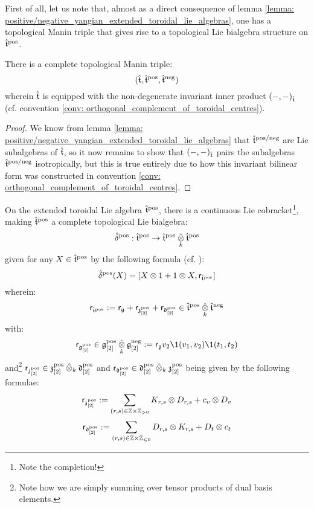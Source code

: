         First of all, let us note that, almost as a direct consequence of lemma \ref{lemma: positive/negative_yangian_extended_toroidal_lie_algebras}, one has a topological Manin triple that gives rise to a topological Lie bialgebra structure on $\hat{\mathfrak{t}}^{\mathrm{pos}}$.
        \begin{theorem} \label{theorem: extended_toroidal_manin_triples}
            There is a complete topological Manin triple:
                $$(\hat{\mathfrak{t}}, \hat{\mathfrak{t}}^{\mathrm{pos}}, \hat{\mathfrak{t}}^{\mathrm{neg}})$$
            wherein $\hat{\mathfrak{t}}$ is equipped with the non-degenerate invariant inner product $(-, -)_{\hat{\mathfrak{t}}}$ (cf. convention \ref{conv: orthogonal_complement_of_toroidal_centres}).
        \end{theorem}
            \begin{proof}
                We know from lemma \ref{lemma: positive/negative_yangian_extended_toroidal_lie_algebras} that $\hat{\mathfrak{t}}^{\mathrm{pos}/\mathrm{neg}}$ are Lie subalgebras of $\hat{\mathfrak{t}}$, so it now remains to show that $(-, -)_{\hat{\mathfrak{t}}}$ pairs the subalgebras $\hat{\mathfrak{t}}^{\mathrm{pos}/\mathrm{neg}}$ isotropically, but this is true entirely due to how this invariant bilinear form was constructed in convention \ref{conv: orthogonal_complement_of_toroidal_centres}.
            \end{proof}
        \begin{corollary} \label{coro: extended_toroidal_lie_bialgebras}
            On the extended toroidal Lie algebra $\hat{\mathfrak{t}}^{\mathrm{pos}}$, there is a continuous Lie cobracket\footnote{Note the completion!}, making $\hat{\mathfrak{t}}^{\mathrm{pos}}$ a complete topological Lie bialgebra:
                $$\hat{\delta}^{\positive}: \extendedtoroidal^{\positive} \to \extendedtoroidal^{\positive} \hattensor_k \extendedtoroidal^{\positive}$$
            given for any $X \in \hat{\mathfrak{t}}^{\mathrm{pos}}$ by the following formula (cf. \cite{etingof_kazhdan_quantisation_1}):
                $$\hat{\delta}^{\positive}(X) = [ X \tensor 1 + 1 \tensor X, \sfr_{\extendedtoroidal^{\positive}} ]$$
            wherein:
                $$\sfr_{\extendedtoroidal^{\positive}} := \sfr_{\g} + \sfr_{\z_{[2]}^{\positive}} + \sfr_{\d_{[2]}^{\positive}} \in \extendedtoroidal^{\positive} \hattensor_k \extendedtoroidal^{\negative}$$
            with:
                $$\sfr_{\g_{[2]}^{\positive}} \in \g_{[2]}^{\positive} \hattensor_k \g_{[2]}^{\negative} := \sfr_{\g} v_2 \1(v_1, v_2) \1(t_1, t_2)$$
            and\footnote{Note how we are simply summing over tensor products of dual basis elements.} $\sfr_{\z_{[2]}^{\positive}} \in \z_{[2]}^{\positive} \hattensor_k \d_{[2]}^{\positive}$ and $\sfr_{\d_{[2]}^{\positive}} \in \d_{[2]}^{\positive} \hattensor_k \z_{[2]}^{\positive}$ being given by the following formulae:
                $$\sfr_{\z_{[2]}^{\positive}} := \sum_{(r, s) \in \Z \x \Z_{> 0}} K_{r, s} \tensor D_{r, s} + c_v \tensor D_v$$
                $$\sfr_{\d_{[2]}^{\positive}} := \sum_{(r, s) \in \Z \x \Z_{\leq 0}} D_{r, s} \tensor K_{r, s} + D_t \tensor c_t$$
        \end{corollary}

